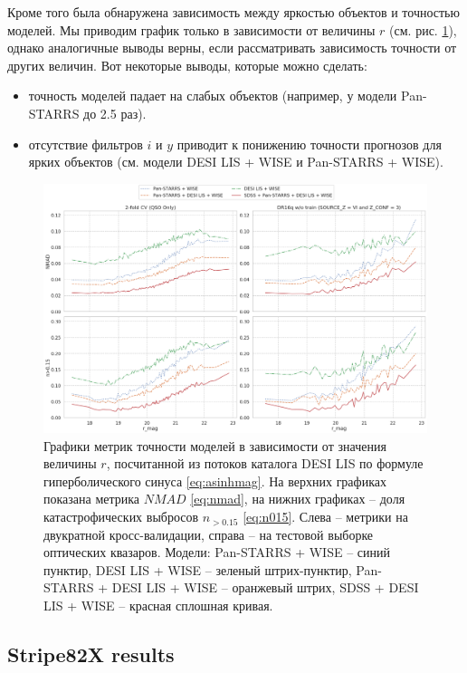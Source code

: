 \documentclass[fleqn,usenatbib]{mnras}
\begin{document}
Кроме того была обнаружена зависимость между яркостью объектов и точностью моделей. Мы приводим график только в зависимости от величины $r$ (см. рис. \ref{fig:metrics-qso_z_mag}), однако аналогичные выводы верны, если рассматривать зависимость точности от других величин. Вот некоторые выводы, которые можно сделать:
\begin{itemize}
    \item точность моделей падает на слабых объектов (например, у модели Pan-STARRS до 2.5 раз).
    \item отсутствие фильтров $i$ и $y$ приводит к понижению точности прогнозов для ярких объектов (см. модели DESI LIS + WISE и Pan-STARRS + WISE).
\end{itemize}

\begin{figure}
    \centering
    \includegraphics[width=0.9\linewidth]{images/metrics-qso_r-mag.png}
    \caption{Графики метрик точности моделей в зависимости от значения величины $r$, посчитанной из потоков каталога DESI LIS по формуле гиперболического синуса \eqref{eq:asinhmag}. На верхних графиках показана метрика $NMAD$ \eqref{eq:nmad}, на нижних графиках -- доля катастрофических выбросов $n_{>0.15}$ \eqref{eq:n015}. Слева -- метрики на двукратной кросс-валидации, справа -- на тестовой выборке оптических квазаров. Модели: Pan-STARRS + WISE -- синий пунктир, DESI LIS + WISE -- зеленый штрих-пунктир, Pan-STARRS + DESI LIS + WISE -- оранжевый штрих, SDSS + DESI LIS + WISE -- красная сплошная кривая.}
    \label{fig:metrics-qso_z_mag}
\end{figure}

\subsection{Stripe82X results}\label{subsec:s82x_results}
\end{document}
